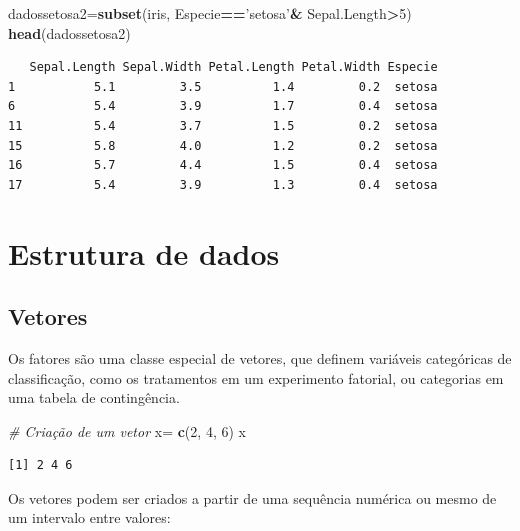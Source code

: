 \documentclass[12pt,brazil,]{book}
\newenvironment{Shaded}{\begin{snugshade}}{\end{snugshade}}
\newcommand{\CommentTok}[1]{\textcolor[rgb]{0.56,0.35,0.01}{\textit{#1}}}
\newcommand{\DecValTok}[1]{\textcolor[rgb]{0.00,0.00,0.81}{#1}}
\newcommand{\KeywordTok}[1]{\textcolor[rgb]{0.13,0.29,0.53}{\textbf{#1}}}
\newcommand{\NormalTok}[1]{#1}
\newcommand{\OperatorTok}[1]{\textcolor[rgb]{0.81,0.36,0.00}{\textbf{#1}}}
\newcommand{\StringTok}[1]{\textcolor[rgb]{0.31,0.60,0.02}{#1}}
\begin{document}
\begin{Shaded}
\begin{Highlighting}[]
\NormalTok{dadossetosa2=}\KeywordTok{subset}\NormalTok{(iris, Especie}\OperatorTok{==}\StringTok{'setosa'}\OperatorTok{&}\StringTok{ }\NormalTok{Sepal.Length}\OperatorTok{>}\DecValTok{5}\NormalTok{)}
\KeywordTok{head}\NormalTok{(dadossetosa2)}
\end{Highlighting}
\end{Shaded}

\begin{verbatim}
   Sepal.Length Sepal.Width Petal.Length Petal.Width Especie
1           5.1         3.5          1.4         0.2  setosa
6           5.4         3.9          1.7         0.4  setosa
11          5.4         3.7          1.5         0.2  setosa
15          5.8         4.0          1.2         0.2  setosa
16          5.7         4.4          1.5         0.4  setosa
17          5.4         3.9          1.3         0.4  setosa
\end{verbatim}

\hypertarget{estrutura-de-dados}{%
\section{Estrutura de dados}\label{estrutura-de-dados}}

\hypertarget{vetores}{%
\subsection{Vetores}\label{vetores}}

Os fatores são uma classe especial de vetores, que definem variáveis
categóricas de classificação, como os tratamentos em um experimento
fatorial, ou categorias em uma tabela de contingência.

\begin{Shaded}
\begin{Highlighting}[]
\CommentTok{# Criação de um vetor}
\NormalTok{x=}\StringTok{ }\KeywordTok{c}\NormalTok{(}\DecValTok{2}\NormalTok{, }\DecValTok{4}\NormalTok{, }\DecValTok{6}\NormalTok{)}
\NormalTok{x}
\end{Highlighting}
\end{Shaded}

\begin{verbatim}
[1] 2 4 6
\end{verbatim}

Os vetores podem ser criados a partir de uma sequência numérica ou mesmo
de um intervalo entre valores:
\end{document}
